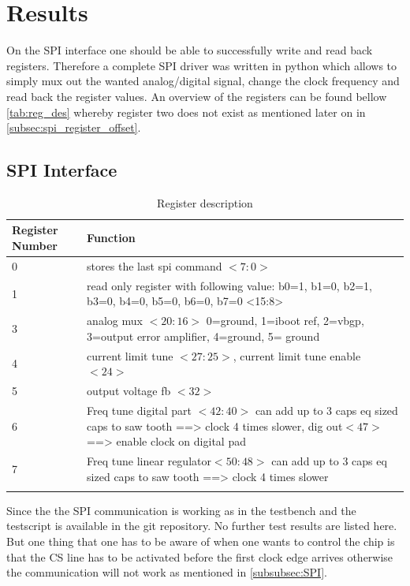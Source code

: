 \section{Results}
\label{sec:results}
On the SPI interface one should be able to successfully write and read back registers. Therefore a complete SPI driver was written in python which allows to simply mux out the wanted analog/digital signal, change the clock frequency and read back the register values. An overview of the registers can be found bellow \autoref{tab:reg_des} whereby register two does not exist as mentioned later on in \autoref{subsec:spi_register_offset}.
\subsection{SPI Interface}
\label{subsec:spi_interface}
\begin{longtable}{|p{3.5cm}|p{10.5cm}|}
	\hline
	\rowcolor{lightgray}
	\textbf{Register Number} &\textbf{Function} \\ \hline
	0 & stores the last spi command $<7:0>$\\ \hline
    1 & read only register with following value: b0=1, b1=0, b2=1, b3=0, b4=0, b5=0, b6=0, b7=0 <15:8> \\ \hline
    3 & analog mux $<20:16>$ 0=ground, 1=iboot ref, 2=vbgp, 3=output error amplifier, 4=ground,  5= ground \\ \hline
	4 & current limit tune $<27:25>$, current limit tune enable $<24>$ \\ \hline
	5 & output voltage fb $<32>$ \\ \hline
	6 & Freq tune digital part $<42:40>$ can add up to 3 caps eq sized caps to saw tooth ==> clock 4 times slower, dig out$<47>$ ==> enable clock on digital pad\\ \hline
    7 & Freq tune linear regulator$<50:48>$ can add up to 3 caps eq sized caps to saw tooth ==> clock 4 times slower \\ \hline
	\caption{Register description} %
	\label{tab:reg_des}
\end{longtable}
Since the the SPI communication is working as in the testbench and the testscript is available in the git repository. No further test results are listed here. But one thing that one has to be aware of when one wants to control the chip is that the CS line has to be activated before the first clock edge arrives otherwise the communication will not work as mentioned in \autoref{subsubsec:SPI}.

